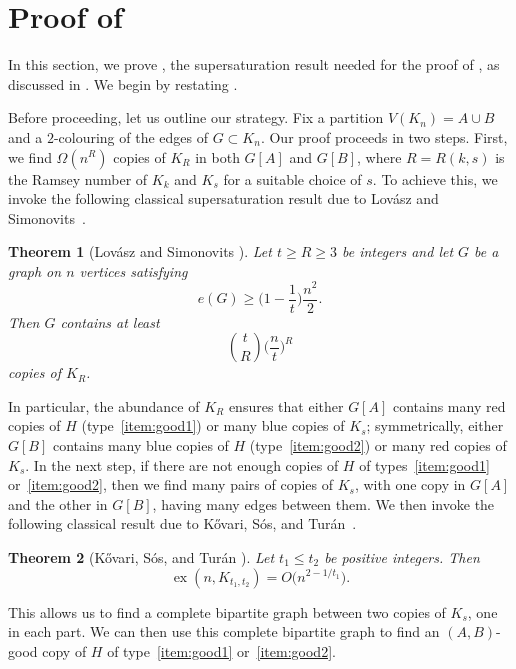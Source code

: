 \documentclass[a4paper,reqno,11pt]{amsart}
\newtheorem{theorem}{Theorem}[section]
\theoremstyle{definition}
\theoremstyle{remark}
\renewcommand\le{\leqslant}
\renewcommand\ge{\geqslant}
\begin{document}
\section{Proof of }\label{sec:4}

In this section, we prove , the supersaturation result needed for the proof of , as discussed in . We begin by restating .

\supersatforABGoodcopies*

Before proceeding, let us outline our strategy. Fix a partition $V(K_n) = A \cup B$ and a $2$-colouring of the edges of $G \subset K_n$. Our proof proceeds in two steps. First, we find $\Omega(n^{R})$ copies of $K_{R}$ in both $G[A]$ and $G[B]$, where $R = R(k,s)$ is the Ramsey number of $K_k$ and $K_s$ for a suitable choice of $s$. To achieve this, we invoke the following classical supersaturation result due to Lov\'asz and Simonovits~\cite{Lovasz-Simonovits}.

\begin{theorem}[Lov\'asz and Simonovits \cite{Lovasz-Simonovits}]\label{thm:lovasz-simonovits} Let $t \ge R\ge 3$ be integers and let $G$ be a graph on $n$ vertices satisfying
\[e(G)\ge \bigg(1 -\frac{1}{t}\bigg)\frac{n^2}{2}.\]
Then $G$ contains at least \[\binom{t}{R}\bigg(\frac{n}{t}\bigg)^R\] 
copies of $K_R$.    
\end{theorem}

In particular, the abundance of $K_{R}$ ensures that either $G[A]$ contains many red copies of $H$ (type~\ref{item:good1}) or many blue copies of $K_{s}$; symmetrically, either $G[B]$ contains many blue copies of $H$ (type~\ref{item:good2}) or many red copies of $K_{s}$. In the next step, if there are not enough copies of $H$ of types~\ref{item:good1} or~\ref{item:good2}, then we find many pairs of copies of $K_{s}$, with one copy in $G[A]$ and the other in $G[B]$, having many edges between them. We then invoke the following classical result due to K\H{o}vari, S\'os, and Tur\'an~\cite{KST}.

\begin{theorem}[K\H{o}vari, S\'os, and Tur\'an \cite{KST}] \label{thm:KST} Let $t_1\le t_2$ be positive integers. Then
    \[\operatorname{ex}(n,K_{t_1,t_2}) = O\big(n^{2-1/t_1}\big).\]
\end{theorem}

This allows us to find a complete bipartite graph between two copies of $K_s$, one in each part. We can then use this complete bipartite graph to find an $(A,B)$-good copy of $H$ of type~\ref{item:good1} or~\ref{item:good2}.
\end{document}
